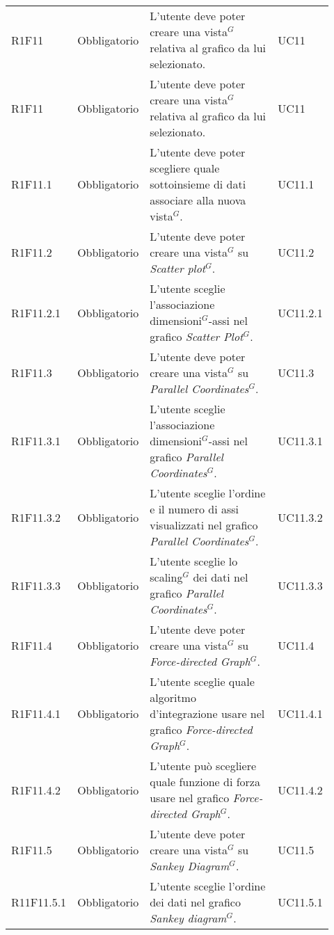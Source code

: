 {\begin{longtable}{p{0.12\linewidth}p{0.15\linewidth}p{0.50\linewidth}p{0.15\linewidth}}
    \rowcolor[RGB]{233, 245, 206}
    R1F11 & Obbligatorio & L'utente deve poter creare una vista$^{G}$ relativa al grafico da lui selezionato. & UC11\\
    \rowcolor[RGB]{216, 235, 171}
    R1F11 & Obbligatorio & L'utente deve poter creare una vista$^{G}$ relativa al grafico da lui selezionato. & UC11\\ 
    \rowcolor[RGB]{233, 245, 206}
    R1F11.1 & Obbligatorio & L'utente deve poter scegliere quale sottoinsieme di dati associare alla nuova vista$^{G}$. & UC11.1\\
    \rowcolor[RGB]{216, 235, 171}
    R1F11.2 & Obbligatorio & L'utente deve poter creare una vista$^{G}$ su \textit{Scatter plot$^{G}$}. & UC11.2\\
    \rowcolor[RGB]{233, 245, 206}
    R1F11.2.1 & Obbligatorio & L'utente sceglie l'associazione dimensioni$^{G}$-assi nel grafico \textit{Scatter Plot$^{G}$}. & UC11.2.1\\
    \rowcolor[RGB]{216, 235, 171}
    R1F11.3 & Obbligatorio & L'utente deve poter creare una vista$^{G}$ su \textit{Parallel Coordinates$^{G}$}. & UC11.3\\
    \rowcolor[RGB]{233, 245, 206}
    R1F11.3.1 & Obbligatorio & L'utente sceglie l'associazione dimensioni$^{G}$-assi nel grafico \textit{Parallel Coordinates$^{G}$}. & UC11.3.1\\
    \rowcolor[RGB]{216, 235, 171}
    R1F11.3.2 & Obbligatorio & L'utente sceglie l'ordine e il numero di assi visualizzati nel grafico \textit{Parallel Coordinates$^{G}$}. &UC11.3.2\\
    \rowcolor[RGB]{233, 245, 206}
    R1F11.3.3 & Obbligatorio & L'utente sceglie lo scaling$^{G}$ dei dati nel grafico \textit{Parallel Coordinates$^{G}$}. & UC11.3.3\\
    \rowcolor[RGB]{216, 235, 171}
    R1F11.4 & Obbligatorio & L'utente deve poter creare una vista$^{G}$ su \textit{Force-directed Graph$^{G}$}. & UC11.4\\
    \rowcolor[RGB]{233, 245, 206}
    R1F11.4.1 & Obbligatorio & L'utente sceglie quale algoritmo d'integrazione usare nel grafico \textit{Force-directed Graph$^{G}$}. & UC11.4.1\\
    \rowcolor[RGB]{216, 235, 171}
    R1F11.4.2 & Obbligatorio & L'utente può scegliere quale funzione di forza usare nel grafico \textit{Force-directed Graph$^{G}$}. & UC11.4.2\\
    \rowcolor[RGB]{233, 245, 206}
    R1F11.5 & Obbligatorio & L'utente deve poter creare una vista$^{G}$ su \textit{Sankey Diagram$^{G}$}. & UC11.5\\
    \rowcolor[RGB]{216, 235, 171}
    R11F11.5.1 & Obbligatorio & L'utente sceglie l'ordine dei dati nel grafico \textit{Sankey diagram$^{G}$}. & UC11.5.1\\


\end{longtable}}
